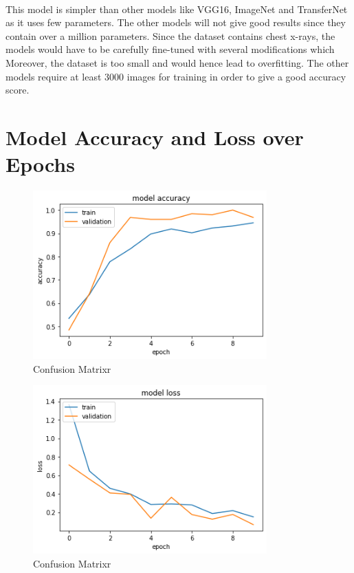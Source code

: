 \documentclass[12pt]{revtex4}
\begin{document}
\\This model is simpler than other models like VGG16, ImageNet and TransferNet as it uses few parameters. The other models will not give good results since they contain over a million parameters. Since the dataset contains chest x-rays, the models would have to be carefully fine-tuned with several modifications which   Moreover, the dataset is too small and would hence lead to overfitting. The other models require at least 3000 images for training in order to give a good accuracy score.

\pagebreak
\section{Model Accuracy and Loss over Epochs}
\begin{figure}[htp]
    \centering
    \includegraphics[width=9cm]{Model_Acc.png}
    \caption{Confusion Matrixr}
    \label{fig:abc}
\end{figure}

\begin{figure}[htp]
    \centering
    \includegraphics[width=9cm]{Model_Loss.png}
    \caption{Confusion Matrixr}
    \label{fig:abc}
\end{figure}

\pagebreak
\end{document}
